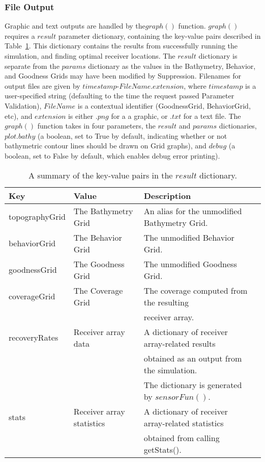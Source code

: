 \subsubsection{File Output}
Graphic and text outputs are handled by the$ graph()$ function.  $graph()$ requires a $result$ parameter dictionary, containing the key-value pairs described in Table~\ref{resultDict}.  This dictionary contains the results from successfully running the simulation, and finding optimal receiver locations.  The $result$ dictionary is separate from the $params$ dictionary as the values in the Bathymetry, Behavior, and Goodness Grids may have been modified by Suppression.  Filenames for output files are given by $timestamp$-$FileName$.$extension$, where $timestamp$ is a user-specified string (defaulting to the time the request passed Parameter Validation), $FileName$ is a contextual identifier (GoodnessGrid, BehaviorGrid, etc), and $extension$ is either $.png$ for a a graphic, or $.txt$ for a text file.  The $graph()$ function takes in four parameters, the $result$ and $params$ dictionaries, $plot.bathy$ (a boolean, set to True by default, indicating whether or not bathymetric contour lines should be drawn on Grid graphs), and $debug$ (a boolean, set to False by default, which enables debug error printing).

\begin{table}[h!]
	\begin{tabular}{l l l l}
		Key	&	Value &	Description\\
		\hline
		topographyGrid	&	The Bathymetry Grid	&	An alias for the unmodified Bathymetry Grid.\\
		behaviorGrid	&	The Behavior Grid			&	The unmodified Behavior Grid.\\
		goodnessGrid	&	The Goodness Grid			&	The unmodified Goodness Grid.\\
		coverageGrid	& 	The Coverage Grid			&	The coverage computed from the resulting\\
						&								&	receiver array.\\
		recoveryRates	& 	Receiver array data			&	A dictionary of receiver array-related results\\
						&								&  obtained as an output from the simulation. \\ &								&  The dictionary is generated by $sensorFun()$.\\
		stats			& 	Receiver array statistics	&	A dictionary of receiver array-related statistics\\
						&								&  obtained from calling getStats().\\
	\end{tabular}
	\caption{A summary of the key-value pairs in the $result$ dictionary.
		\label{resultDict}}
\end{table}



